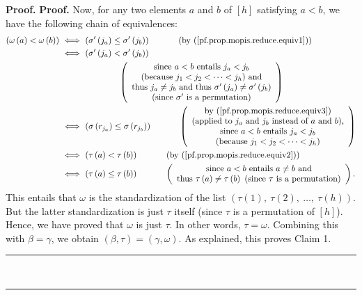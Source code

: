 \documentclass[numbers=enddot,12pt,final,onecolumn,notitlepage]{scrartcl}%
\theoremstyle{definition}
\newenvironment{fineprint}{\begin{small}}{\end{small}}
\newenvironment{proof}[1][Proof]{\noindent\textbf{#1.} }{\ \rule{0.5em}{0.5em}}
\begin{document}
\begin{fineprint}
\begin{proof}
\begin{proof}
Now, for any two elements $a$ and $b$ of $\left[  h\right]  $ satisfying
$a<b$, we have the following chain of equivalences:%
\begin{align*}
\left(  \omega\left(  a\right)  <\omega\left(  b\right)  \right)  \  &
\Longleftrightarrow\ \left(  \sigma^{\prime}\left(  j_{a}\right)  \leq
\sigma^{\prime}\left(  j_{b}\right)  \right)  \ \ \ \ \ \ \ \ \ \ \left(
\text{by (\ref{pf.prop.mopis.reduce.equiv1})}\right) \\
&  \Longleftrightarrow\ \left(  \sigma^{\prime}\left(  j_{a}\right)
<\sigma^{\prime}\left(  j_{b}\right)  \right) \\
&  \ \ \ \ \ \ \ \ \ \ \ \ \ \ \ \ \ \ \ \ \left(
\begin{array}
[c]{c}%
\text{since }a<b\text{ entails }j_{a}<j_{b}\\
\text{(because }j_{1}<j_{2}<\cdots<j_{h}\text{) and}\\
\text{thus }j_{a}\neq j_{b}\text{ and thus }\sigma^{\prime}\left(
j_{a}\right)  \neq\sigma^{\prime}\left(  j_{b}\right) \\
\text{(since }\sigma^{\prime}\text{ is a permutation)}%
\end{array}
\right) \\
&  \Longleftrightarrow\ \left(  \sigma\left(  r_{j_{a}}\right)  \leq
\sigma\left(  r_{j_{b}}\right)  \right)  \ \ \ \ \ \ \ \ \ \ \left(
\begin{array}
[c]{c}%
\text{by (\ref{pf.prop.mopis.reduce.equiv3})}\\
\text{(applied to }j_{a}\text{ and }j_{b}\text{ instead of }a\text{ and
}b\text{),}\\
\text{since }a<b\text{ entails }j_{a}<j_{b}\\
\text{(because }j_{1}<j_{2}<\cdots<j_{h}\text{)}%
\end{array}
\right) \\
&  \Longleftrightarrow\ \left(  \tau\left(  a\right)  <\tau\left(  b\right)
\right)  \ \ \ \ \ \ \ \ \ \ \left(  \text{by
(\ref{pf.prop.mopis.reduce.equiv2})}\right) \\
&  \Longleftrightarrow\ \left(  \tau\left(  a\right)  \leq\tau\left(
b\right)  \right)  \ \ \ \ \ \ \ \ \ \ \left(
\begin{array}
[c]{c}%
\text{since }a<b\text{ entails }a\neq b\text{ and}\\
\text{thus }\tau\left(  a\right)  \neq\tau\left(  b\right)  \text{ (since
}\tau\text{ is a permutation)}%
\end{array}
\right)  .
\end{align*}
This entails that $\omega$ is the standardization of the list $\left(
\tau\left(  1\right)  ,\ \tau\left(  2\right)  ,\ \ldots,\ \tau\left(
h\right)  \right)  $. But the latter standardization is just $\tau$ itself
(since $\tau$ is a permutation of $\left[  h\right]  $). Hence, we have proved
that $\omega$ is just $\tau$. In other words, $\tau=\omega$. Combining this
with $\beta=\gamma$, we obtain $\left(  \beta,\tau\right)  =\left(
\gamma,\omega\right)  $. As explained, this proves Claim 1.
\end{proof}


\end{proof}
\end{fineprint}
\end{document}
